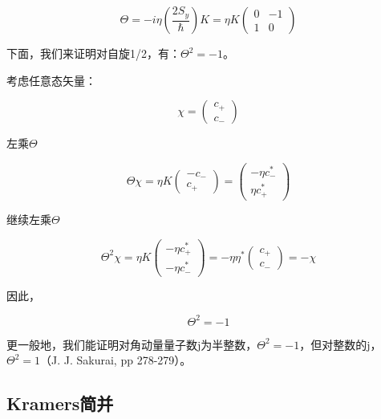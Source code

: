 \begin{equation}
\Theta = - i \eta \left( \frac{2 S_y}{ \hbar} \right) K = \eta K \left( \begin{array}{cc} 0 & -1  \\ 1 & 0 \end{array} \right) 
\end{equation}

下面，我们来证明对自旋1/2，有：$\Theta^2 = -1$。

考虑任意态矢量：

\begin{equation}
\chi = \left( \begin{array}{c} c_+  \\  c_- \end{array} \right)
\end{equation}

左乘$\Theta$

\begin{equation}
\Theta \chi = \eta K \left(  \begin{array}{c}  -c_-  \\ c_+  \end{array}  \right) =  \left(  \begin{array}{c}  - \eta c_-^*  \\  \eta c_+^*  \end{array}  \right)
\end{equation}

继续左乘$\Theta$

\begin{equation}
\Theta^2 \chi = \eta K \left(  \begin{array}{c} -\eta c_+^*  \\ - \eta c_-^* \end{array}  \right) = - \eta \eta^* \left( \begin{array}{c} c_+  \\  c_- \end{array} \right) = - \chi
\end{equation}

因此，

\begin{equation}
\Theta^2 = -1
\end{equation}

更一般地，我们能证明对角动量量子数j为半整数，$\Theta^2 = -1$，但对整数的j，$\Theta^2 = 1$（J. J. Sakurai, pp 278-279）。

\subsection{Kramers简并}

